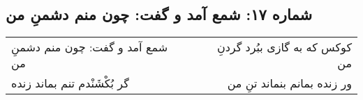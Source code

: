 \begin{center}
\section*{شماره ۱۷: شمع آمد و گفت: چون منم دشمنِ من}
\label{sec:017}
\begin{longtable}{l p{0.5cm} r}
شمع آمد و گفت: چون منم دشمنِ من
&&
کوکس که به گازی ببُرد گردنِ من
\\
گر بُکْشَنْدم تنم بماند زنده
&&
ور زنده بمانم بنماند تنِ من
\\
\end{longtable}
\end{center}
